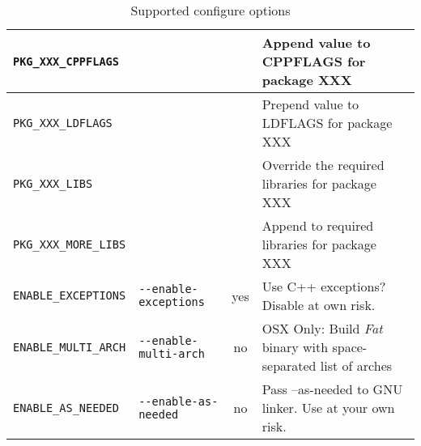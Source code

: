 \begin{table}
\begin{longtable}{|l|l|c|m{5cm}|}
\hline
\small\verb#PKG_XXX_CPPFLAGS#         &                                         &                  & Append value to CPPFLAGS for package XXX\tabularnewline
\hline
\small\verb#PKG_XXX_LDFLAGS#          &                                         &                  & Prepend value to LDFLAGS for package XXX\tabularnewline
\hline
\small\verb#PKG_XXX_LIBS#             &                                         &                  & Override the required libraries for package XXX\tabularnewline
\hline
\small\verb#PKG_XXX_MORE_LIBS#        &                                         &                  & Append to required libraries for package XXX\tabularnewline
\hline
\small\verb#ENABLE_EXCEPTIONS#        & \small\verb#--enable-exceptions#        & yes              & Use C++ exceptions? Disable at own risk.\tabularnewline
\hline
\small\verb#ENABLE_MULTI_ARCH#        & \small\verb#--enable-multi-arch#        & no               & OSX Only: Build \emph{Fat} binary with space-separated list of arches\tabularnewline
\hline
\small\verb#ENABLE_AS_NEEDED#         & \small\verb#--enable-as-needed#         & no               & Pass --as-needed to GNU linker. Use at your own risk.\tabularnewline
\hline
\end{longtable}\caption{\label{tab:Supported-configure-options}Supported configure options}
\end{table}
